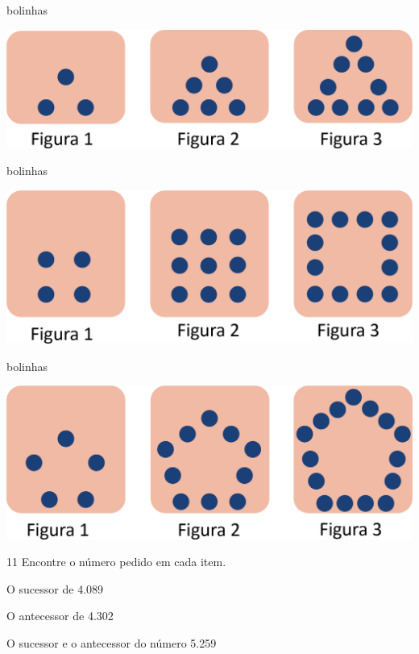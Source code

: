 \begin{escolha}
\item {} bolinhas

\begin{center}
\includegraphics[width=.7\textwidth]{./media/image33.png}
\end{center}

\item {} bolinhas

\begin{center}
\includegraphics[width=.7\textwidth]{./media/image34.png}
\end{center}
\item {} bolinhas

\begin{center}
\includegraphics[width=.7\textwidth]{./media/image35.png}
\end{center}
\end{escolha}

\num{11} Encontre o número pedido em cada item.

\begin{escolha}
\item O sucessor de 4.089\\
\reduline{4.090\hfill}

\item O antecessor de 4.302\\
\reduline{4.301\hfill}

\item O sucessor e o antecessor do número 5.259\\
\end{escolha}


